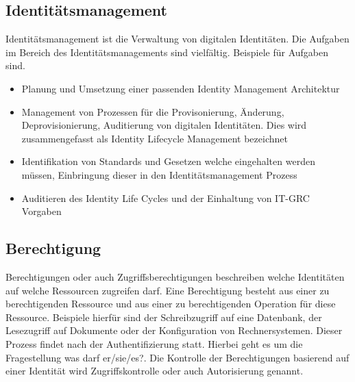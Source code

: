 \documentclass[12pt]{article}
\begin{document}
\subsection{Identitätsmanagement}
Identitätsmanagement ist die Verwaltung von digitalen Identitäten. Die Aufgaben im Bereich des Identitätsmanagements sind vielfältig. Beispiele für Aufgaben sind.
\begin{itemize}
  \item Planung und Umsetzung einer passenden Identity Management Architektur~\cite{windley2005digital}
  \item Management von Prozessen für die Provisonierung, Änderung, Deprovisionierung, Auditierung von digitalen Identitäten. Dies wird zusammengefasst als Identity Lifecycle Management bezeichnet~\cite{sharma2016identity}
  \item Identifikation von Standards und Gesetzen welche eingehalten werden müssen, Einbringung dieser in den Identitätsmanagement Prozess~\cite{azhar2014economics}
  \item Auditieren des Identity Life Cycles und der Einhaltung von IT-GRC Vorgaben~\cite{peyton2007audit}~\cite{accorsi2008automated}
\end{itemize}
\subsection{Berechtigung}
Berechtigungen oder auch Zugriffsberechtigungen beschreiben welche Identitäten auf welche Ressourcen zugreifen darf. Eine Berechtigung besteht aus einer zu berechtigenden Ressource und aus einer zu berechtigenden Operation für diese Ressource. Beispiele hierfür sind der Schreibzugriff auf eine Datenbank, der Lesezugriff auf Dokumente oder der Konfiguration von Rechnersystemen. Dieser Prozess findet nach der Authentifizierung statt. Hierbei geht es um die Fragestellung \glqq{}was darf er/sie/es?\grqq{}. Die Kontrolle der Berechtigungen basierend auf einer Identität wird Zugriffskontrolle oder auch Autorisierung genannt.~\cite{tsolkas2017}
\end{document}
